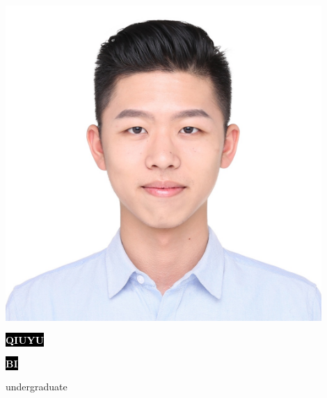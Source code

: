 \documentclass[9pt]{developercv} %
\begin{document}
\begin{minipage}{0.20\textwidth}
    \includegraphics[width=0.9\textwidth]{photo.jpg}
\end{minipage}
\begin{minipage}[t]{0.30\textwidth} %
    \vspace{-\baselineskip} %

    \colorbox{black}{{\HUGE\textcolor{white}{\textbf{\MakeUppercase{Qiuyu}}}}} %

    \colorbox{black}{{\HUGE\textcolor{white}{\textbf{\MakeUppercase{Bi}}}}} %

    \vspace{6pt}

    {\huge undergraduate} %
\end{minipage}
\begin{minipage}[t]{0.275\textwidth} %
    \vspace{-\baselineskip} %

    \\
    \\
    \\
\end{minipage}
\end{document}
